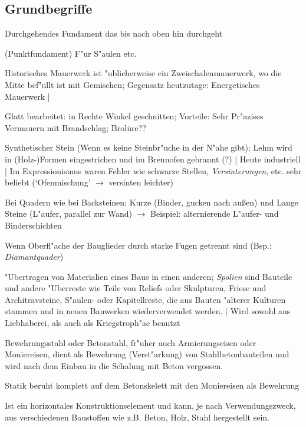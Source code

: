 \documentclass[]{scrartcl}
\begin{document}
\subsection{Grundbegriffe}

\begin{description}[leftmargin=!,labelwidth=\widthof{\bfseries Halbs"Stahlbetonskelettba}]
  \item[Streifenfundament] Durchgehendes Fundament das bis nach oben hin durchgeht
  \item[Einzelfundament] (Punktfundament) F"ur S"aulen etc.
  \item[Mauerwerk] Historisches Mauerwerk ist "ublicherweise ein Zweischalenmauerwerk, wo die Mitte bef"ullt ist mit Gemischen; Gegensatz heutzutage: Energetisches Mauerwerk | 
  \item[Quader] Glatt bearbeitet: in Rechte Winkel geschnitten; Vorteile: Sehr Pr"azises Vermauern mit Brandschlag; Brolüre??
  \item[Backstein] Synthetischer Stein (Wenn es keine Steinbr"uche in der N"ahe gibt); Lehm wird in (Holz-)Formen eingestrichen und im Brennofen gebrannt (?) | Heute industriell | Im Expressionismus waren Fehler wie schwarze Stellen, \emph{Versinterungen}, etc. sehr beliebt (`Ofenmischung' $\rightarrow$ versinten leichter)
  \item[Binder \& L"aufer] Bei Quadern wie bei Backsteinen: Kurze (Binder, gucken nach au\ss en) und Lange Steine (L"aufer, parallel zur Wand) $\rightarrow$ Beispiel: alternierende L"aufer- und Binderschichten
  \item[Rustizierung] Wenn Oberfl"ache der Bauglieder durch starke Fugen getrennt sind (Bsp.: \emph{Diamantquader})
  \item[Spoliation] "Ubertragen von Materialien eines Baus in einen anderen; \emph{Spolien} sind Bauteile und andere "Uberreste wie Teile von Reliefs oder Skulpturen, Friese und Architravsteine, S"aulen- oder Kapitellreste, die aus Bauten "alterer Kulturen stammen und in neuen Bauwerken wiederverwendet werden. | Wird sowohl aus Liebhaberei, als auch als Kriegstroph"ae benutzt
  \item[Standger"ust]
  \item[Fliegendes Ger"ust]
  \item[Ger"ustloch]
  \item[Amierung] Bewehrungsstahl oder Betonstahl, fr"uher auch Armierungseisen oder Moniereisen, dient als Bewehrung (Verst"arkung) von Stahlbetonbauteilen und wird nach dem Einbau in die Schalung mit Beton vergossen.
  \item[Stahlbetonskelettbau] Statik beruht komplett auf dem Betonskelett mit den Moniereisen als Bewehrung
  \item[Schalung (Beton)]
  \item[Binder] Ist ein horizontales Konstruktionselement und kann, je nach Verwendungszweck, aus verschiedenen Baustoffen wie z.B. Beton, Holz, Stahl hergestellt sein.
\end{description}
\end{document}

